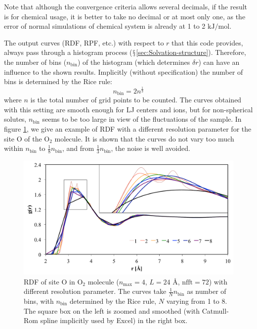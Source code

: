 Note that although the convergence criteria allows several decimals,
if the result is for chemical usage, it is better to take no decimal
or at most only one, as the error of normal simulations of chemical
system is already at 1 to 2 $\mathrm{kJ/mol}$.

The output curves (\acs{RDF}, \acs{RPF}, etc.) with respect to $r$
that this code provides, always pass through a histogram process ($\mathsection$\ref{sec:Solvation-structure}).
Therefore, the number of bins ($n_{\mathrm{bin}}$) of the histogram
(which determines $\delta r$) can have an influence to the shown
results. Implicitly (without specification) the number of bins is
determined by the Rice rule:
\begin{equation}
n_{\mathrm{bin}}=2n^{\frac{1}{3}}
\end{equation}
where $n$ is the total number of grid points to be counted. The curves
obtained with this setting are smooth enough for LJ centers and ions,
but for non-spherical solutes, $n_{\mathrm{bin}}$ seems to be too
large in view of the fluctuations of the sample. In figure \ref{fig:rdf-with-different},
we give an example of \acs{RDF} with a different resolution parameter
for the site O of the $\mathrm{O_{2}}$ molecule. It is shown that
the curves do not vary too much within $n_{\mathrm{bin}}$ to $\frac{1}{8}n_{\mathrm{bin}}$,
and from $\frac{1}{3}n_{\mathrm{bin}}$, the noise is well avoided.

\begin{figure}[h]
\begin{centering}
\includegraphics[bb=0cm 0.6cm 33cm 18cm,width=0.8\columnwidth]{_figure/results/rdf-smoothing}
\par\end{centering}
\caption[\acs{RDF} with different resolution parameter]{\acs{RDF} of site O in $\mathrm{O_{2}}$ molecule ($n_{\max}=4$,
$L=24$ $\textrm{Å}$, $\mathrm{nfft}=72$) with different resolution
parameter. The curves take $\frac{1}{N}n_{\mathrm{bin}}$ as number
of bins, with $n_{\mathrm{bin}}$ determined by the Rice rule, $N$
varying from 1 to 8. The square box on the left is zoomed and smoothed
(with Catmull-Rom spline implicitly used by Excel) in the right box.\label{fig:rdf-with-different}}
\end{figure}


